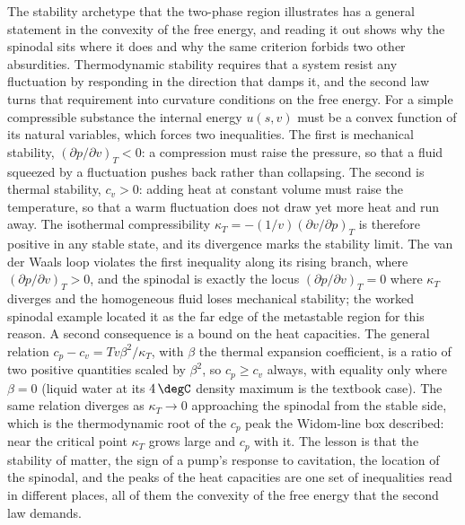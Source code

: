 \begin{mastery}
The stability archetype that the two-phase region illustrates has a general
statement in the convexity of the free energy, and reading it out shows why the
spinodal sits where it does and why the same criterion forbids two other
absurdities. Thermodynamic stability requires that a system resist any
fluctuation by responding in the direction that damps it, and the second law
turns that requirement into curvature conditions on the free energy. For a
simple compressible substance the internal energy $u(s, v)$ must be a convex
function of its natural variables, which forces two inequalities. The first is
mechanical stability, $(\partial p/\partial v)_T < 0$: a compression must raise
the pressure, so that a fluid squeezed by a fluctuation pushes back rather than
collapsing. The second is thermal stability, $c_v > 0$: adding heat at constant
volume must raise the temperature, so that a warm fluctuation does not draw yet
more heat and run away. The isothermal compressibility $\kappa_T =
-(1/v)(\partial v/\partial p)_T$ is therefore positive in any stable state, and
its divergence marks the stability limit. The van der Waals loop violates the
first inequality along its rising branch, where $(\partial p/\partial v)_T >
0$, and the spinodal is exactly the locus $(\partial p/\partial v)_T = 0$ where
$\kappa_T$ diverges and the homogeneous fluid loses mechanical stability; the
worked spinodal example located it as the far edge of the metastable region for
this reason. A second consequence is a bound on the heat capacities. The
general relation $c_p - c_v = T v \beta^2/\kappa_T$, with $\beta$ the thermal
expansion coefficient, is a ratio of two positive quantities scaled by
$\beta^2$, so $c_p \ge c_v$ always, with equality only where $\beta = 0$ (liquid
water at its $4\,\degC$ density maximum is the textbook case). The same relation
diverges as $\kappa_T \to 0$ approaching the spinodal from the stable side,
which is the thermodynamic root of the $c_p$ peak the Widom-line box described:
near the critical point $\kappa_T$ grows large and $c_p$ with it. The lesson is
that the stability of matter, the sign of a pump's response to cavitation, the
location of the spinodal, and the peaks of the heat capacities are one set of
inequalities read in different places, all of them the convexity of the free
energy that the second law demands.
\end{mastery}

